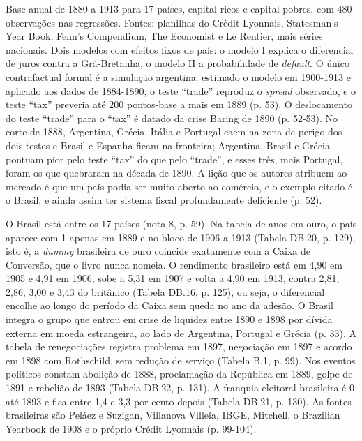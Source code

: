 Base anual de 1880 a 1913 para 17 países, capital-ricos e capital-pobres,
com 480 observações nas regressões. Fontes: planilhas do Crédit Lyonnais,
Statesman's Year Book, Fenn's Compendium, The Economist e Le Rentier, mais
séries nacionais. Dois modelos com efeitos fixos de país: o modelo I explica o
diferencial de juros contra a Grã-Bretanha, o modelo II a probabilidade de
\emph{default}. O único contrafactual formal é a simulação argentina: estimado
o modelo em 1900-1913 e aplicado aos dados de 1884-1890, o teste ``trade''
reproduz o \emph{spread} observado, e o teste ``tax'' preveria até 200
pontos-base a mais em 1889 (p. 53). O deslocamento do teste ``trade'' para o
``tax'' é datado da crise Baring de 1890 (p. 52-53). No corte de 1888,
Argentina, Grécia, Itália e Portugal caem na zona de perigo dos dois testes e
Brasil e Espanha ficam na fronteira; Argentina, Brasil e Grécia pontuam pior
pelo teste ``tax'' do que pelo ``trade'', e esses três, mais Portugal, foram
os que quebraram na década de 1890. A lição que os autores atribuem ao mercado
é que um país podia ser muito aberto ao comércio, e o exemplo citado é o
Brasil, e ainda assim ter sistema fiscal profundamente deficiente (p. 52).

O Brasil está entre os 17 países (nota 8, p. 59). Na tabela de anos em ouro, o
país aparece com 1 apenas em 1889 e no bloco de 1906 a 1913 (Tabela DB.20,
p. 129), isto é, a \emph{dummy} brasileira de ouro coincide exatamente com a
Caixa de Conversão, que o livro nunca nomeia. O rendimento brasileiro está em
4,90 em 1905 e 4,91 em 1906, sobe a 5,31 em 1907 e volta a 4,90 em 1913,
contra 2,81, 2,86, 3,00 e 3,43 do britânico (Tabela DB.16, p. 125), ou seja, o
diferencial encolhe ao longo do período da Caixa sem queda no ano da adesão. O
Brasil
integra o grupo que entrou em crise de liquidez entre 1890 e 1898 por dívida
externa em moeda estrangeira, ao lado de Argentina, Portugal e Grécia (p. 33).
A tabela de renegociações registra problema em 1897, negociação em 1897 e
acordo em 1898 com Rothschild, sem redução de serviço (Tabela B.1, p. 99). Nos
eventos políticos constam abolição de 1888, proclamação da República em 1889,
golpe de 1891 e rebelião de 1893 (Tabela DB.22, p. 131). A franquia eleitoral
brasileira é 0 até 1893 e fica entre 1,4 e 3,3 por cento depois (Tabela DB.21,
p. 130). As fontes brasileiras são Peláez e Suzigan, Villanova Villela, IBGE,
Mitchell, o Brazilian Yearbook de 1908 e o próprio Crédit Lyonnais
(p. 99-104).

